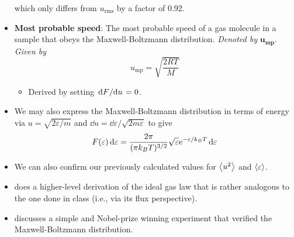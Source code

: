 \documentclass[../notes.tex]{subfiles}
\begin{document}
\begin{itemize}
    which only differs from $u_\text{rms}$ by a factor of 0.92.
    \item \textbf{Most probable speed}: The most probable speed of a gas molecule in a sample that obeys the Maxwell-Boltzmann distribution. \emph{Denoted by} $\bm{u_\text{mp}}$. \emph{Given by}
    \begin{equation*}
        u_\text{mp} = \sqrt{\frac{2RT}{M}}
    \end{equation*}
    \begin{itemize}
        \item Derived by setting $\dv*{F}{u}=0$.
    \end{itemize}
    \item We may also express the Maxwell-Boltzmann distribution in terms of energy via $u=\sqrt{2\varepsilon/m}$ and $\dd{u}=\dd{\varepsilon}/\sqrt{2m\varepsilon}$ to give
    \begin{equation*}
        F(\varepsilon)\dd{\varepsilon} = \frac{2\pi}{(\pi k_BT)^{3/2}}\sqrt{\varepsilon}\e[-\varepsilon/k_BT]\dd{\varepsilon}
    \end{equation*}
    \item We can also confirm our previously calculated values for $\prb{u^2}$ and $\prb{\varepsilon}$.
    \item \textcite{bib:McQuarrieSimon} does a higher-level derivation of the ideal gas law that is rather analogous to the one done in class (i.e., via its flux perspective).
    \item \textcite{bib:McQuarrieSimon} discusses a simple and Nobel-prize winning experiment that verified the Maxwell-Boltzmann distribution.
\end{itemize}
\end{document}
